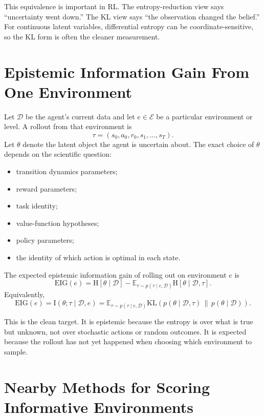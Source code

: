\documentclass[11pt]{article}
\newcommand{\D}{\mathcal{D}}
\newcommand{\E}{\mathbb{E}}
\newcommand{\Env}{\mathcal{E}}
\newcommand{\KL}{\mathrm{KL}}
\newcommand{\Hent}{\mathrm{H}}
\newcommand{\I}{\mathrm{I}}
\begin{document}
This equivalence is important in RL. The entropy-reduction view says
``uncertainty went down.'' The KL view says ``the observation changed the
belief.'' For continuous latent variables, differential entropy can be
coordinate-sensitive, so the KL form is often the cleaner measurement.

\section{Epistemic Information Gain From One Environment}

Let $\D$ be the agent's current data and let $e \in \Env$ be a particular
environment or level. A rollout from that environment is
\begin{equation}
  \tau = (s_0,a_0,r_0,s_1,\ldots,s_T).
\end{equation}
Let $\theta$ denote the latent object the agent is uncertain about. The exact
choice of $\theta$ depends on the scientific question:
\begin{itemize}[leftmargin=*]
  \item transition dynamics parameters;
  \item reward parameters;
  \item task identity;
  \item value-function hypotheses;
  \item policy parameters;
  \item the identity of which action is optimal in each state.
\end{itemize}

The expected epistemic information gain of rolling out on environment $e$ is
\begin{equation}
  \mathrm{EIG}(e)
  =
  \Hent[\theta \mid \D]
  -
  \E_{\tau \sim p(\tau \mid e,\D)}
  \Hent[\theta \mid \D,\tau].
\end{equation}
Equivalently,
\begin{equation}
  \mathrm{EIG}(e)
  =
  \I(\theta;\tau \mid \D,e)
  =
  \E_{\tau \sim p(\tau \mid e,\D)}
  \KL\left(p(\theta \mid \D,\tau)\,\|\,p(\theta \mid \D)\right).
\end{equation}

This is the clean target. It is epistemic because the entropy is over what is
true but unknown, not over stochastic actions or random outcomes. It is expected
because the rollout has not yet happened when choosing which environment to
sample.

\section{Nearby Methods for Scoring Informative Environments}
\end{document}
